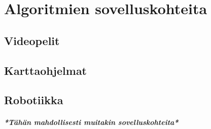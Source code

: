 \chapter{Algoritmien sovelluskohteita} \label{algoritmienSovelluskohteita}
\section{Videopelit}\label{videopelit}
\section{Karttaohjelmat}\label{karttaohjelmat}
\section{Robotiikka}\label{robotiikka}

\paragraph{\textit{*Tähän mahdollisesti muitakin sovelluskohteita*}}
